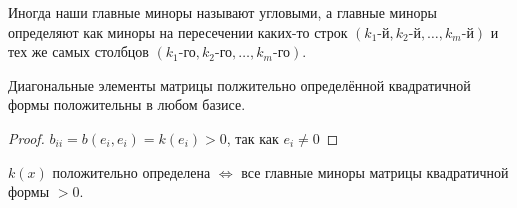\documentclass[11pt]{article}
\begin{document}
\begin{remark}
  Иногда наши главные миноры называют угловыми, а главные миноры 
  определяют как миноры на пересечении каких-то строк $(k_1 
  \text{-й}, k_2 \text{-й}, \ldots, k_m \text{-й})$ и тех же самых 
  столбцов $(k_1 \text{-го}, k_2 \text{-го}, \ldots, k_m \text{-го})$.
\end{remark}

\begin{lemma}
  Диагональные элементы матрицы полжительно определённой квадратичной 
  формы положительны в любом базисе.
\end{lemma}

\begin{proof}
  $b_{ii} = b(e_i, e_i) = k(e_i) > 0$, так как $e_i \neq 0$
\end{proof}

\begin{theorem}
  $k(x)$ положительно определена $\Longleftrightarrow$ все главные 
  миноры матрицы квадратичной формы $> 0$.
\end{theorem}
\end{document}
